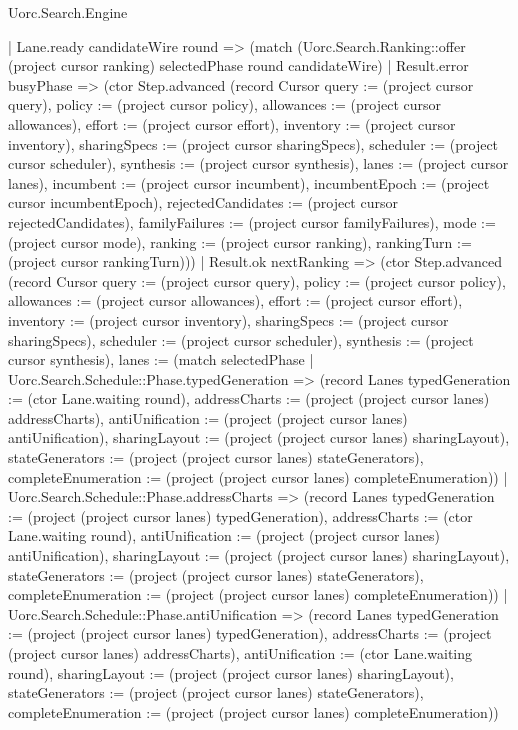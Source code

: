 \begin{lexlean}{Uorc.Search.Engine}
\begin{semanticmodule}
{    | Lane.ready candidateWire round => (match (Uorc.Search.Ranking::offer (project cursor ranking) selectedPhase round candidateWire)
      | Result.error busyPhase => (ctor Step.advanced (record Cursor {query := (project cursor query), policy := (project cursor policy), allowances := (project cursor allowances), effort := (project cursor effort), inventory := (project cursor inventory), sharingSpecs := (project cursor sharingSpecs), scheduler := (project cursor scheduler), synthesis := (project cursor synthesis), lanes := (project cursor lanes), incumbent := (project cursor incumbent), incumbentEpoch := (project cursor incumbentEpoch), rejectedCandidates := (project cursor rejectedCandidates), familyFailures := (project cursor familyFailures), mode := (project cursor mode), ranking := (project cursor ranking), rankingTurn := (project cursor rankingTurn)}))
      | Result.ok nextRanking => (ctor Step.advanced (record Cursor {query := (project cursor query), policy := (project cursor policy), allowances := (project cursor allowances), effort := (project cursor effort), inventory := (project cursor inventory), sharingSpecs := (project cursor sharingSpecs), scheduler := (project cursor scheduler), synthesis := (project cursor synthesis), lanes := (match selectedPhase
        | Uorc.Search.Schedule::Phase.typedGeneration => (record Lanes {typedGeneration := (ctor Lane.waiting round), addressCharts := (project (project cursor lanes) addressCharts), antiUnification := (project (project cursor lanes) antiUnification), sharingLayout := (project (project cursor lanes) sharingLayout), stateGenerators := (project (project cursor lanes) stateGenerators), completeEnumeration := (project (project cursor lanes) completeEnumeration)})
        | Uorc.Search.Schedule::Phase.addressCharts => (record Lanes {typedGeneration := (project (project cursor lanes) typedGeneration), addressCharts := (ctor Lane.waiting round), antiUnification := (project (project cursor lanes) antiUnification), sharingLayout := (project (project cursor lanes) sharingLayout), stateGenerators := (project (project cursor lanes) stateGenerators), completeEnumeration := (project (project cursor lanes) completeEnumeration)})
        | Uorc.Search.Schedule::Phase.antiUnification => (record Lanes {typedGeneration := (project (project cursor lanes) typedGeneration), addressCharts := (project (project cursor lanes) addressCharts), antiUnification := (ctor Lane.waiting round), sharingLayout := (project (project cursor lanes) sharingLayout), stateGenerators := (project (project cursor lanes) stateGenerators), completeEnumeration := (project (project cursor lanes) completeEnumeration)})
}}
\end{semanticmodule}
\end{lexlean}
